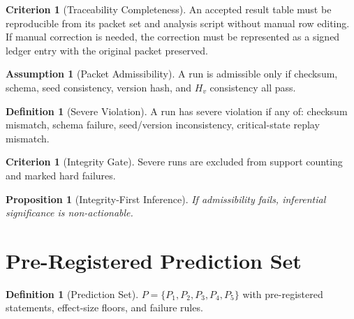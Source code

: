\documentclass[11pt,a4paper]{article}
\newtheorem{proposition}[theorem]{Proposition}
\theoremstyle{definition}
\newtheorem{definition}[theorem]{Definition}
\newtheorem{assumption}[theorem]{Assumption}
\newtheorem{criterion}[theorem]{Criterion}
\begin{document}
\begin{criterion}[Traceability Completeness]
An accepted result table must be reproducible from its packet set and analysis
script without manual row editing. If manual correction is needed, the correction
must be represented as a signed ledger entry with the original packet preserved.
\end{criterion}

\begin{assumption}[Packet Admissibility]
A run is admissible only if checksum, schema, seed consistency, version hash, and $H_v$ consistency all pass.
\end{assumption}

\begin{definition}[Severe Violation]
A run has severe violation if any of:
checksum mismatch, schema failure, seed/version inconsistency, critical-state replay mismatch.
\end{definition}

\begin{criterion}[Integrity Gate]
Severe runs are excluded from support counting and marked hard failures.
\end{criterion}

\begin{proposition}[Integrity-First Inference]
If admissibility fails, inferential significance is non-actionable.
\end{proposition}

\section{Pre-Registered Prediction Set}
\begin{definition}[Prediction Set]
$P=\{P_1,P_2,P_3,P_4,P_5\}$ with pre-registered statements, effect-size floors, and failure rules.
\end{definition}
\end{document}
